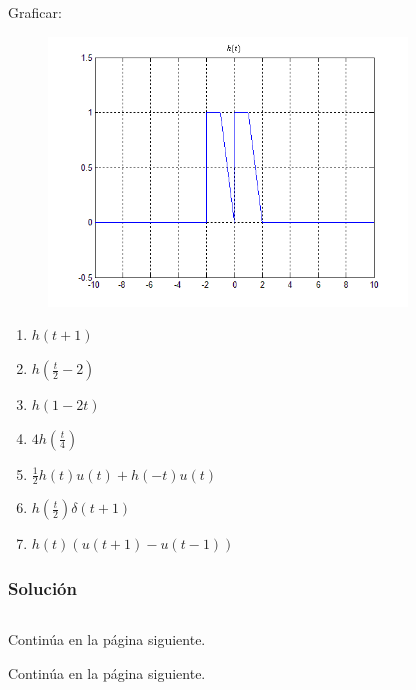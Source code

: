 \documentclass[a4paper,12pt,final]{article}
\begin{document}
    \noindent Graficar:
    \begin{figure}
      \centering
        \includegraphics[width=0.85\textwidth]{./laboratorio_2/0_grafica_h(t).png}
    \end{figure}

    \begin{enumerate}
        \item $h\left(t+1\right)$
        \item $h\left(\frac{t}{2}-2\right)$
        \item $h\left(1-2t\right)$
        \item $4h\left(\frac{t}{4}\right)$
        \item $\frac{1}{2}h\left(t\right)u\left(t\right) + h\left(-t\right)u\left(t\right)$
        \item $h\left(\frac{t}{2}\right)\delta\left(t+1\right)$
        \item $h\left(t\right)\left(u\left(t+1\right)-u\left(t-1\right)\right)$
    \end{enumerate}

    \subsubsection*{Solución}
      \begin{listing}[H]
        \caption{}
        \label{script07}
        \inputminted[firstline=5,lastline=33]{matlab}{./laboratorio_2/problema07.m}
      \end{listing}
      \vspace{-1em}
      \noindent\small{Continúa en la página siguiente.}
      \vspace{\fill}

      \newpage
      \noindent\small{Continúa en la página siguiente.}
      \vspace{-1em}
      \begin{listing}[H]
        \inputminted[firstline=35]{matlab}{./laboratorio_2/problema07.m}
      \end{listing}

\end{document}
